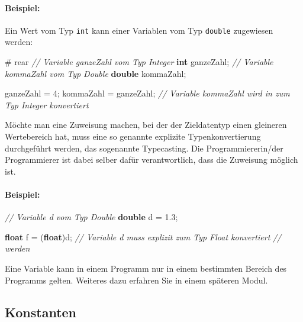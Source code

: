 \documentclass[10pt,paper=17cm:22cm, twoside=true, DIV=14]{scrbook}
\newenvironment {Shaded}
        {\begin{mdframed}[style=code] }
         {\end{mdframed}}
\newcommand{\DataTypeTok}[1]{\textcolor[rgb]{0.1,0.1,0.1}{\textbf{#1}}}
\newcommand{\DecValTok}[1]{\textcolor[rgb]{0.4,0.4,0.4}{{#1}}}
\newcommand{\FloatTok}[1]{\textcolor[rgb]{0.4,0.4,0.4}{{#1}}}
\newcommand{\CommentTok}[1]{\textcolor[RGB]{128,128,128}{\textit{#1}}}
\newcommand{\NormalTok}[1]{#1}
\begin{document}
\paragraph{Beispiel:}\label{beispiel-2}

Ein Wert vom Typ \texttt{int} kann einer Variablen vom Typ
\texttt{double} zugewiesen werden:

\begin{Shaded}
\begin{Highlighting}[]
\NormalTok{# rear}
\CommentTok{// Variable ganzeZahl vom Typ Integer}
\DataTypeTok{int} \NormalTok{ganzeZahl;}
\CommentTok{// Variable kommaZahl vom Typ Double}
\DataTypeTok{double} \NormalTok{kommaZahl;}

\NormalTok{ganzeZahl = }\DecValTok{4}\NormalTok{;}
\NormalTok{kommaZahl = ganzeZahl;}
\CommentTok{// Variable kommaZahl wird in zum Typ Integer konvertiert}
\end{Highlighting}
\end{Shaded}

Möchte man eine Zuweisung machen, bei der der Zieldatentyp einen
gleineren Wertebereich hat, muss eine so genannte explizite
Typenkonvertierung durchgeführt werden, das sogenannte Typecasting. Die
Programmiererin/der Programmierer ist dabei selber dafür verantwortlich,
dass die Zuweisung möglich ist.

\paragraph{Beispiel:}\label{beispiel-3}

\begin{Shaded}
\begin{Highlighting}[]
\CommentTok{// Variable d vom Typ Double}
\DataTypeTok{double} \NormalTok{d = }\FloatTok{1.3}\NormalTok{;}

\DataTypeTok{float} \NormalTok{f = (}\DataTypeTok{float}\NormalTok{)d;}
\CommentTok{// Variable d muss explizit zum Typ Float konvertiert }
\CommentTok{// werden}
\end{Highlighting}
\end{Shaded}

Eine Variable kann in einem Programm nur in einem bestimmten Bereich des
Programms gelten. Weiteres dazu erfahren Sie in einem späteren Modul.

\subsection{Konstanten}\label{konstanten}
\end{document}
